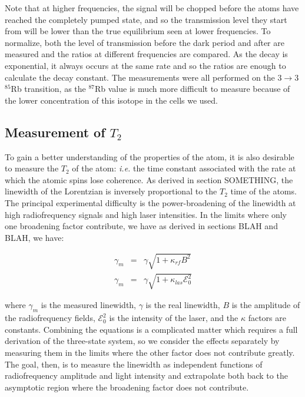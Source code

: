 Note that at higher frequencies, the signal will be chopped before the atoms have reached the completely pumped state, and so the transmission level they start from will be lower than the true equilibrium seen at lower frequencies. To normalize, both the level of transmission before the dark period and after are measured and the ratios at different frequencies are compared. As the decay is exponential, it always occurs at the same rate and so the ratios are enough to calculate the decay constant. The measurements were all performed on the $3\rightarrow3$ $^{85}$Rb transition, as the $^{87}$Rb value is much more difficult to measure because of the lower concentration of this isotope in the cells we used.

\subsection{Measurement of $T_{2}$} \label{measurementoft2}

To gain a better understanding of the properties of the atom, it is also desirable to measure the $T_{2}$ of the atom: \emph{i.e.} the time constant associated with the rate at which the atomic spins lose coherence. As derived in section SOMETHING, the linewidth of the Lorentzian is inversely proportional to the $T_{2}$ time of the atoms. The principal experimental difficulty is the power-broadening of the linewidth at high radiofrequency signals and high laser intensities. In the limits where only one broadening factor contribute, we have as derived in sections BLAH and BLAH, we have:

\begin{eqnarray}
\gamma_{m} &=& \gamma \sqrt{1+ \kappa_{rf} B^{2}} \label{eq:rfbroad}\\
\gamma_{m} &=&\gamma \sqrt{1+ \kappa_{las} \mathcal{E}_{0}^{2}} \label{eq:lightbroad}
\end{eqnarray}

where $\gamma_{m}$ is the measured linewidth, $\gamma$ is the real linewidth, $B$ is the amplitude of the radiofrequency fields, $\mathcal{E}_{0}^{2}$ is the intensity of the laser, and the $\kappa$ factors are constants. Combining the equations is a complicated matter which requires a full derivation of the three-state system, so we consider the effects separately by measuring them in the limits where the other factor does not contribute greatly. The goal, then, is to measure the linewidth as independent functions of radiofrequency amplitude and light intensity and extrapolate both back to the asymptotic region where the broadening factor does not contribute.

